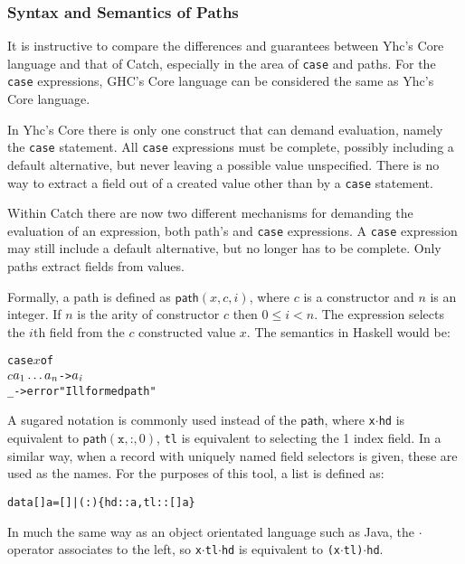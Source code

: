 \documentclass[preprint]{sigplanconf}
\newcommand{\T}[1]{\texttt{#1}}
\newcommand{\mtxt}[1]{\textsf{#1}}
\newenvironment{code}{\begin{alltt}\small}{\end{alltt}}
\newcommand{\D}{\ensuremath{\cdot}} %
\newcommand{\s}[1]{\ensuremath{_{\tt #1}}} %
\begin{document}
\subsubsection{Syntax and Semantics of Paths}

It is instructive to compare the differences and guarantees between Yhc's Core
language and that of Catch, especially in the area of \T{case} and paths. For
the \T{case} expressions, GHC's Core language can be considered the same as
Yhc's Core language.

In Yhc's Core there is only one construct that can demand evaluation, namely
the \T{case} statement. All \T{case} expressions must be complete, possibly
including a default alternative, but never leaving a possible value
unspecified. There is no way to extract a field out of a created value other
than by a \T{case} statement.

Within Catch there are now two different mechanisms for demanding the
evaluation of an expression, both path's and \T{case} expressions. A \T{case}
expression may still include a default alternative, but no longer has to be
complete. Only paths extract fields from values.

Formally, a path is defined as $\mtxt{path}(x,c,i)$, where $c$ is a constructor
and $n$ is an integer. If $n$ is the arity of constructor $c$ then $0 \leq i <
n$. The expression selects the $i$th field from the $c$ constructed value $x$.
The semantics in Haskell would be:

\begin{code}
 case \(x\) of
     \(c\) \(a\s{\textrm{1}}\ldots{}a\s{\textit{n}}\) -> \(a\s{\textit{i}}\)
     _ -> error "Ill formed path"
\end{code}

A sugared notation is commonly used instead of the $\textsf{path}$, where
\T{x\D{}hd} is equivalent to $\textsf{path}(\T{x},\T{:},0)$, \T{tl} is
equivalent to selecting the 1 index field. In a similar way, when a record with
uniquely named field selectors is given, these are used as the names. For the
purposes of this tool, a list is defined as:

\begin{code}
 data [] a = [] | (:) \{hd :: a, tl :: [] a\}
\end{code}

In much the same way as an object orientated language such as Java, the \D{}
operator associates to the left, so \T{x\D{}tl\D{}hd} is equivalent to
\T{(x\D{}tl)\D{}hd}.
\end{document}
